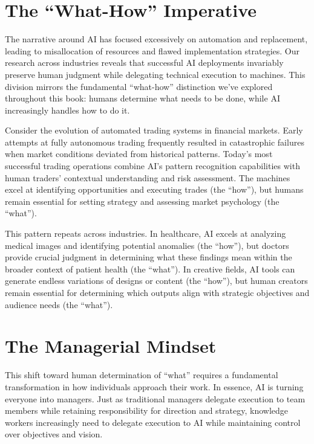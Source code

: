 \documentclass[
  Letterpaper,
]{scrbook}
\begin{document}
\section{The ``What-How'' Imperative}\label{the-what-how-imperative}

The narrative around AI has focused excessively on automation and
replacement, leading to misallocation of resources and flawed
implementation strategies. Our research across industries reveals that
successful AI deployments invariably preserve human judgment while
delegating technical execution to machines. This division mirrors the
fundamental ``what-how'' distinction we've explored throughout this
book: humans determine what needs to be done, while AI increasingly
handles how to do it.

Consider the evolution of automated trading systems in financial
markets. Early attempts at fully autonomous trading frequently resulted
in catastrophic failures when market conditions deviated from historical
patterns. Today's most successful trading operations combine AI's
pattern recognition capabilities with human traders' contextual
understanding and risk assessment. The machines excel at identifying
opportunities and executing trades (the ``how''), but humans remain
essential for setting strategy and assessing market psychology (the
``what'').

This pattern repeats across industries. In healthcare, AI excels at
analyzing medical images and identifying potential anomalies (the
``how''), but doctors provide crucial judgment in determining what these
findings mean within the broader context of patient health (the
``what''). In creative fields, AI tools can generate endless variations
of designs or content (the ``how''), but human creators remain essential
for determining which outputs align with strategic objectives and
audience needs (the ``what'').

\section{The Managerial Mindset}\label{the-managerial-mindset}

This shift toward human determination of ``what'' requires a fundamental
transformation in how individuals approach their work. In essence, AI is
turning everyone into managers. Just as traditional managers delegate
execution to team members while retaining responsibility for direction
and strategy, knowledge workers increasingly need to delegate execution
to AI while maintaining control over objectives and vision.
\end{document}

